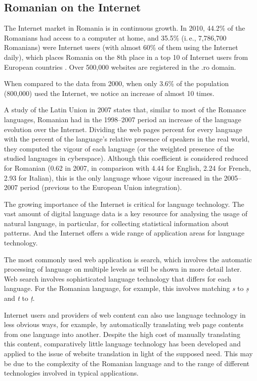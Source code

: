 \begin{multicols}{2}
\subsection{Romanian on the Internet}

The Internet market in Romania is in continuous growth. In 2010, 44.2\% of the Romanians had access to a computer at home, and 35.5\% (i.\,e., 7,786,700 Romanians) were Internet users \cite{urlInternetStatsRO} (with almost 60\% of them using the Internet daily), which places Romania on the 8th place in a top 10 of Internet users from European countries \cite{urlInternetStatsEU}. Over 500,000 websites are registered in the .ro domain.

When compared to the data from 2000, when only 3.6\% of the population (800,000) used the Internet, we notice an increase of almost 10 times.

A study of the Latin Union in 2007 \cite{uniunealat} states that, similar to most of the Romance languages, Romanian had in the 1998--2007 period an increase of the language evolution over the Internet. Dividing the web pages percent for every language with the percent of the language’s relative presence of speakers in the real world, they computed the vigour of each language (or the weighted presence of the studied languages in cyberspace). Although this coefficient is considered reduced for Romanian (0.62 in 2007, in comparison with 4.44 for English, 2.24 for French, 2.93 for Italian), this is the only language whose vigour increased in the 2005--2007 period (previous to the European Union integration). 


The growing importance of the Internet is critical for language technology. The vast amount of digital language data is a key resource for analysing the usage of natural language, in particular, for collecting statistical information about patterns. And the Internet offers a wide range of application areas for language technology. 

The most commonly used web application is search, which involves the automatic processing of language on multiple levels as will be shown in more detail later. Web search involves sophisticated language technology that differs for each language. For the Romanian language, for example, this involves matching \textit{s} to \textit{ș} and \textit{t} to \textit{ț}.

Internet users and providers of web content can also use language technology in less obvious ways, for example, by automatically translating web page contents from one language into another. Despite the high cost of manually translating this content, comparatively little language technology has been developed and applied to the issue of website translation in light of the supposed need. This may be due to the complexity of the Romanian language and to the range of different technologies involved in typical applications.


\end{multicols}
